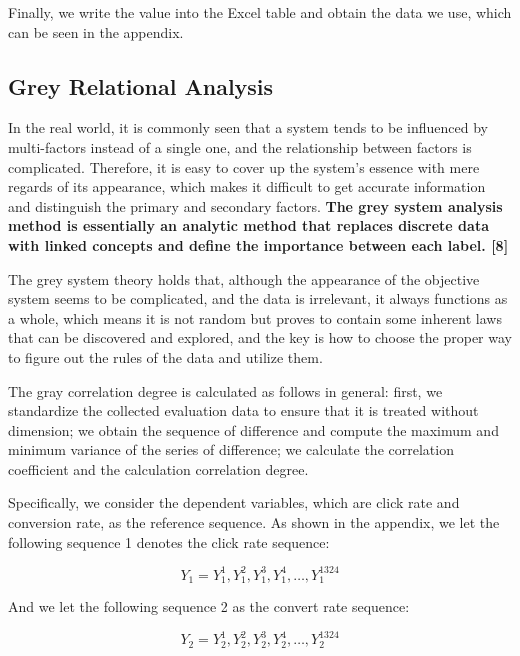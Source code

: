 Finally, we write the value into the Excel table and obtain the data we use, which can be seen in the appendix. 

\subsection{Grey Relational Analysis}

In the real world, it is commonly seen that a system tends to be influenced by multi-factors instead of a single one, and the relationship between factors is complicated. Therefore, it is easy to cover up the system’s essence with mere regards of its appearance, which makes it difficult to get accurate information and distinguish the primary and secondary factors. \textbf{The grey system analysis method is essentially an analytic method that replaces discrete data with linked concepts and define the importance between each label. [8]}

The grey system theory holds that, although the appearance of the objective system seems to be complicated, and the data is irrelevant, it always functions as a whole, which means it is not random but proves to contain some inherent laws that can be discovered and explored, and the key is how to choose the proper way to figure out the rules of the data and utilize them. 

The gray correlation degree is calculated as follows in general: first, we standardize the collected evaluation data to ensure that it is treated without dimension; we obtain the sequence of difference and compute the maximum and minimum variance of the series of difference; we calculate the correlation coefficient and the calculation correlation degree. 

Specifically, we consider the dependent variables, which are click rate and conversion rate, as the reference sequence. As shown in the appendix, we let the following sequence 1 denotes the click rate sequence: 

\begin{equation}
Y _ { 1 } = Y _ { 1 } ^ { 1 } , Y _ { 1 } ^ { 2 } , Y _ { 1 } ^ { 3 } , Y _ { 1 } ^ { 4 } , \ldots , Y _ { 1 } ^ { 1324 }
\end{equation}

And we let the following sequence 2 as the convert rate sequence: 

\begin{equation}
Y _ { 2 } = Y _ { 2 } ^ { 1 } , Y _ { 2 } ^ { 2 } , Y _ { 2 } ^ { 3 } , Y _ { 2 } ^ { 4 } , \ldots , Y _ { 2 } ^ { 1324 }
\end{equation}

